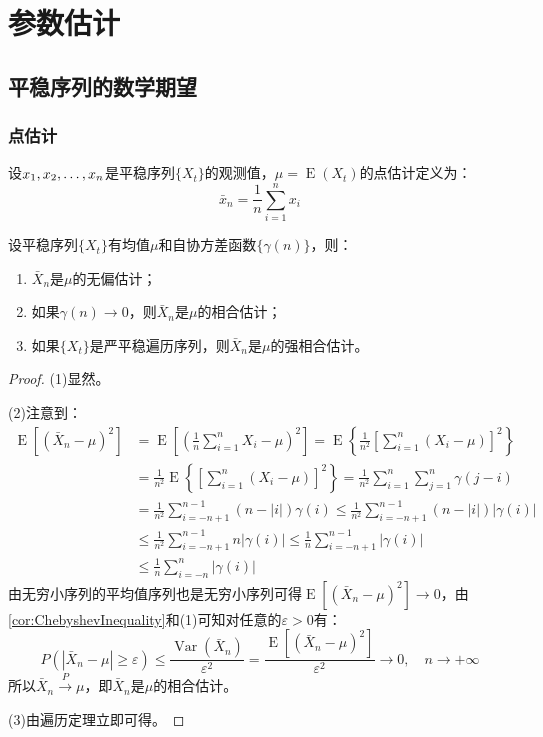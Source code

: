 \section{参数估计}

\subsection{平稳序列的数学期望}
\subsubsection{点估计}
\begin{definition}
	设$x_1, x_2, \dots, x_{n}$是平稳序列$\{X_t\}$的观测值，$\mu=\operatorname{E}(X_t)$的点估计定义为：
	\begin{equation*}
		\bar{x}_n=\frac{1}{n}\sum_{i=1}^{n}x_i
	\end{equation*}
\end{definition}
\begin{theorem}
	设平稳序列$\{X_t\}$有均值$\mu$和自协方差函数$\{\gamma(n)\}$，则：
	\begin{enumerate}
		\item $\bar{X}_n$是$\mu$的无偏估计；
		\item 如果$\gamma(n)\to0$，则$\bar{X}_n$是$\mu$的相合估计；
		\item 如果$\{X_t\}$是严平稳遍历序列，则$\bar{X}_n$是$\mu$的强相合估计。
	\end{enumerate}
\end{theorem}
\begin{proof}
	(1)显然。\par
	(2)注意到：
	\begin{align*}
		\operatorname{E}[(\bar{X}_n-\mu)^2]&=\operatorname{E}\left[\left(\frac{1}{n}\sum_{i=1}^{n}X_i-\mu\right)^2\right]=\operatorname{E}\left\{\frac{1}{n^2}\left[\sum_{i=1}^{n}(X_i-\mu)\right]^2\right\} \\
		&=\frac{1}{n^2}\operatorname{E}\left\{\left[\sum_{i=1}^{n}(X_i-\mu)\right]^2\right\}=\frac{1}{n^2}\sum_{i=1}^{n}\sum_{j=1}^{n}\gamma(j-i) \\
		&=\frac{1}{n^2}\sum_{i=-n+1}^{n-1}(n-|i|)\gamma(i)\leqslant\frac{1}{n^2}\sum_{i=-n+1}^{n-1}(n-|i|)|\gamma(i)| \\
		&\leqslant\frac{1}{n^2}\sum_{i=-n+1}^{n-1}n|\gamma(i)|\leqslant\frac{1}{n}\sum_{i=-n+1}^{n-1}|\gamma(i)| \\
		&\leqslant\frac{1}{n}\sum_{i=-n}^{n}|\gamma(i)|
	\end{align*}
	由无穷小序列的平均值序列也是无穷小序列可得$\operatorname{E}[(\bar{X}_n-\mu)^2]\to0$，由\cref{cor:ChebyshevInequality}和(1)可知对任意的$\varepsilon>0$有：
	\begin{equation*}
		P(|\bar{X}_n-\mu|\geqslant\varepsilon)\leqslant\frac{\operatorname{Var}(\bar{X}_n)}{\varepsilon^2}=\frac{\operatorname{E}[(\bar{X}_n-\mu)^2]}{\varepsilon^2}\to0,\quad n\to+\infty
	\end{equation*}
	所以$\bar{X}_n\overset{P}{\longrightarrow}\mu$，即$\bar{X}_n$是$\mu$的相合估计。\par
	(3)由遍历定理立即可得。
\end{proof}
